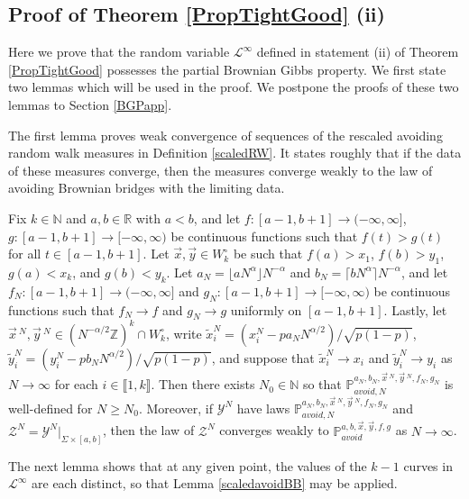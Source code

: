 \subsection{Proof of Theorem \ref{PropTightGood} (ii)}

Here we prove that the random variable $\mathcal{L}^\infty$ defined in statement (ii) of Theorem \ref{PropTightGood} possesses the partial Brownian Gibbs property. We first state two lemmas which will be used in the proof. We postpone the proofs of these two lemmas to Section \ref{BGPapp}. 

The first lemma proves weak convergence of sequences of the rescaled avoiding random walk measures in Definition \ref{scaledRW}. It states roughly that if the data of these measures converge, then the measures converge weakly to the law of avoiding Brownian bridges with the limiting data.

\begin{lemma}\label{scaledavoidBB}
	Fix $k\in\mathbb{N}$ and $a,b\in\mathbb{R}$ with $a<b$, and let $f:[a-1,b+1]\to(-\infty,\infty]$, $g:[a-1,b+1]\to[-\infty,\infty)$ be continuous functions such that $f(t) > g(t)$ for all $t\in[a-1,b+1]$. Let $\vec{x},\vec{y}\in W_k^\circ$ be such that $f(a) > x_1$, $f(b) > y_1$, $g(a) < x_k$, and $g(b) < y_k$. Let $a_N = \lfloor aN^\alpha\rfloor N^{-\alpha}$ and $b_N = \lceil bN^\alpha\rceil N^{-\alpha}$, and let $f_N : [a-1,b+1]\to(-\infty,\infty]$ and $g_N : [a-1,b+1]\to[-\infty,\infty)$ be continuous functions such that $f_N\to f$ and $g_N\to g$ uniformly on $[a-1,b+1]$. Lastly, let $\vec{x}\,^N, \vec{y}\,^N \in (N^{-\alpha/2}\mathbb{Z})^k \cap W_k^\circ$, write $\tilde{x}^N_i = (x_i^N - pa_N N^{\alpha/2})/\sqrt{p(1-p)}$, $\tilde{y}^N_i = (y_i^N - pb_N N^{\alpha/2})/\sqrt{p(1-p)}$, and suppose that $\tilde{x}^N_i \to x_i$ and $\tilde{y}^N_i \to y_i$ as $N\to\infty$ for each $i\in\llbracket 1,k\rrbracket$. Then there exists $N_0 \in \mathbb{N}$ so that $\mathbb{P}^{a_N,b_N,\vec{x}\,^N,\vec{y}\,^N,f_N,g_N}_{avoid,N}$ is well-defined for $N\geq N_0$. Moreover, if $\mathcal{Y}^N$ have laws $\mathbb{P}^{a_N,b_N,\vec{x}\,^N,\vec{y}\,^N,f_N,g_N}_{avoid,N}$ and $\mathcal{Z}^N = \mathcal{Y}^N|_{\Sigma\times[a,b]}$, then the law of $\mathcal{Z}^N$ converges weakly to $\mathbb{P}^{a,b,\vec{x},\vec{y},f,g}_{avoid}$ as $N\to\infty$.
\end{lemma}

The next lemma shows that at any given point, the values of the $k-1$ curves in $\mathcal{L}^\infty$ are each distinct, so that Lemma \ref{scaledavoidBB} may be applied.


